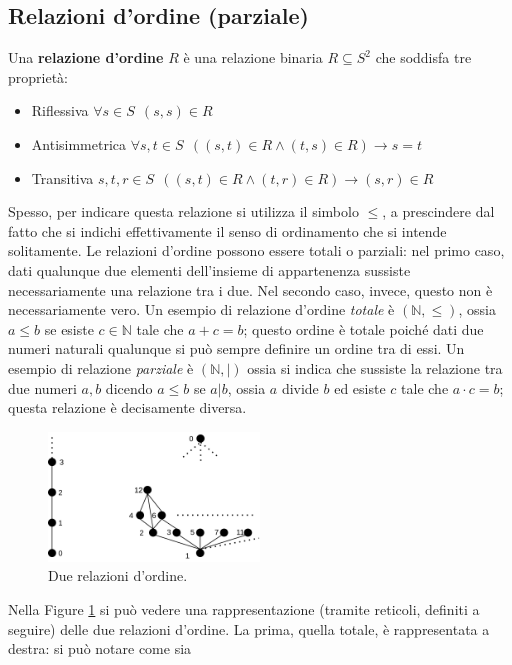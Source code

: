 \subsection{Relazioni d'ordine (parziale)}
Una \textbf{relazione d'ordine} $R$ è una relazione 
binaria $R \subseteq S^2$ che soddisfa tre 
proprietà: 
\begin{itemize}
  \item Riflessiva $\forall s \in S ~~ (s,s) \in R$
  \item Antisimmetrica $\forall s, t \in S ~~ ((s,t)\in R \land  (t,s) \in R) \rightarrow s = t$
  \item Transitiva $s,t,r \in S  ~~ ((s,t) \in R \land (t,r) \in R) \rightarrow (s,r) \in R$
\end{itemize}
Spesso, per indicare questa relazione si utilizza il simbolo $\leq$, a prescindere 
dal fatto che si indichi effettivamente il senso di ordinamento che si intende 
solitamente. Le relazioni d'ordine possono essere totali o parziali: nel 
primo caso, dati qualunque due elementi dell'insieme di appartenenza sussiste 
necessariamente una relazione tra i due. Nel secondo caso, invece, questo non 
è necessariamente vero. 
Un esempio di relazione d'ordine \textit{totale} è 
$(\mathbb{N}, \leq)$, ossia $a \leq b$ se esiste $c \in \mathbb{N}$ tale 
che $a + c = b$; questo ordine è totale poiché dati due numeri 
naturali qualunque si può sempre definire un ordine tra di essi.
Un esempio di relazione \textit{parziale} è 
$(\mathbb{N}, |)$ ossia si indica che sussiste la relazione 
tra due numeri $a, b$ dicendo $a \leq b$ se $a | b$, ossia $a$ divide $b$ 
ed esiste $c$ tale che $a \cdot c = b$; questa relazione è decisamente 
diversa.
\begin{figure}[!h]
  \centering 
  \includegraphics[width=0.5\textwidth]{images/reticolo2.png}
  \caption{Due relazioni d'ordine.}
  \label{figure:relazionireticoli}
\end{figure}
Nella Figure \ref{figure:relazionireticoli} si può vedere una rappresentazione 
(tramite reticoli, definiti a seguire) delle due relazioni d'ordine. 
La prima, quella totale, è rappresentata a destra: si può notare come sia 
